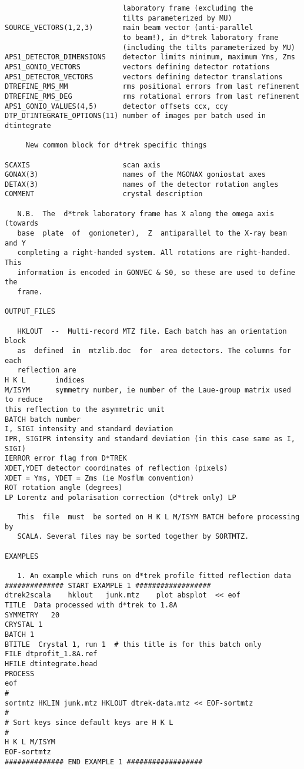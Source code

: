 \documentclass[a4paper, 11pt]{article}
\begin{document}
{\begin{verbatim}
                            laboratory frame (excluding the
                            tilts parameterized by MU)
SOURCE_VECTORS(1,2,3)       main beam vector (anti-parallel
                            to beam!), in d*trek laboratory frame
                            (including the tilts parameterized by MU)
APS1_DETECTOR_DIMENSIONS    detector limits minimum, maximum Yms, Zms
APS1_GONIO_VECTORS          vectors defining detector rotations
APS1_DETECTOR_VECTORS       vectors defining detector translations
DTREFINE_RMS_MM             rms positional errors from last refinement
DTREFINE_RMS_DEG            rms rotational errors from last refinement
APS1_GONIO_VALUES(4,5)      detector offsets ccx, ccy
DTP_DTINTEGRATE_OPTIONS(11) number of images per batch used in dtintegrate

     New common block for d*trek specific things

SCAXIS                      scan axis
GONAX(3)                    names of the MGONAX goniostat axes
DETAX(3)                    names of the detector rotation angles
COMMENT                     crystal description

   N.B.  The  d*trek laboratory frame has X along the omega axis (towards
   base  plate  of  goniometer),  Z  antiparallel to the X-ray beam and Y
   completing a right-handed system. All rotations are right-handed. This
   information is encoded in GONVEC & S0, so these are used to define the
   frame.

OUTPUT_FILES

   HKLOUT  --  Multi-record MTZ file. Each batch has an orientation block
   as  defined  in  mtzlib.doc  for  area detectors. The columns for each
   reflection are
H K L       indices
M/ISYM      symmetry number, ie number of the Laue-group matrix used to reduce
this reflection to the asymmetric unit
BATCH batch number
I, SIGI intensity and standard deviation
IPR, SIGIPR intensity and standard deviation (in this case same as I, SIGI)
IERROR error flag from D*TREK
XDET,YDET detector coordinates of reflection (pixels)
XDET = Yms, YDET = Zms (ie Mosflm convention)
ROT rotation angle (degrees)
LP Lorentz and polarisation correction (d*trek only) LP

   This  file  must  be sorted on H K L M/ISYM BATCH before processing by
   SCALA. Several files may be sorted together by SORTMTZ.

EXAMPLES

   1. An example which runs on d*trek profile fitted reflection data
############## START EXAMPLE 1 ##################
dtrek2scala    hklout   junk.mtz    plot absplot  << eof
TITLE  Data processed with d*trek to 1.8A
SYMMETRY   20
CRYSTAL 1
BATCH 1
BTITLE  Crystal 1, run 1  # this title is for this batch only
FILE dtprofit_1.8A.ref
HFILE dtintegrate.head
PROCESS
eof
#
sortmtz HKLIN junk.mtz HKLOUT dtrek-data.mtz << EOF-sortmtz
#
# Sort keys since default keys are H K L
#
H K L M/ISYM
EOF-sortmtz
############## END EXAMPLE 1 ##################


\end{verbatim}}
\end{document}
